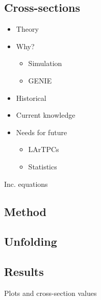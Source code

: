 \subsection{Cross-sections}
    \begin{itemize}

        \item Theory
        \item Why?
        
        \begin{itemize}

            \item Simulation
            \item GENIE

        \end{itemize}
        
        \item Historical
        \item Current knowledge
        \item Needs for future
        
        \begin{itemize}

            \item LArTPCs
            \item Statistics

        \end{itemize}

    \end{itemize}

Inc. equations
\subsection{Method}
\subsection{Unfolding}
\subsection{Results}
Plots and cross-section values

\clearpage
